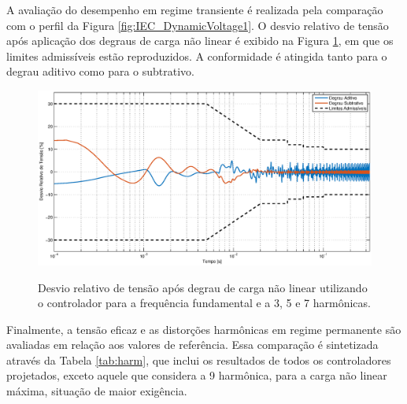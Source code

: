 \documentclass[repeatfields,oneside]{tcc}
\begin{document}
\newpage
A avaliação do desempenho em regime transiente é realizada pela comparação com o perfil da Figura \ref{fig:IEC_DynamicVoltage1}.
O desvio relativo de tensão após aplicação dos degraus de carga não linear é exibido na Figura \ref{fig:iec_7}, em que os limites admissíveis estão reproduzidos.
A conformidade é atingida tanto para o degrau aditivo como para o subtrativo.

\begin{figure}[h]
    \centering
    \caption{Desvio relativo de tensão após degrau de carga não linear utilizando o controlador para a frequência fundamental e a 3{\textordfeminine}, 5{\textordfeminine} e 7{\textordfeminine} harmônicas.}
    \includegraphics[trim={80 20 80 20}, clip, width=0.7\linewidth]{fig/IEC_7.eps}
    \\
    \label{fig:iec_7}
\end{figure}

Finalmente, a tensão eficaz e as distorções harmônicas em regime permanente são avaliadas em relação aos valores de referência.
Essa comparação é sintetizada através da Tabela \ref{tab:harm}, que inclui os resultados de todos os controladores projetados, exceto aquele que considera a 9{\textordfeminine} harmônica, para a carga não linear máxima, situação de maior exigência.
\end{document}
